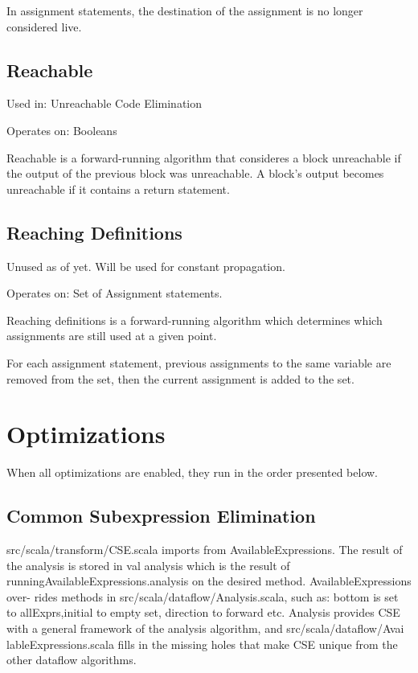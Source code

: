 \documentclass[11pt]{article}
\begin{document}
  In assignment statements, the destination of the assignment is no longer considered live.
\subsection{Reachable}
\label{sec-2-3}

  Used in: Unreachable Code Elimination

  Operates on: Booleans

  Reachable is a forward-running algorithm that consideres a block unreachable if the output of the previous
  block was unreachable. A block's output becomes unreachable if it contains a return statement.
\subsection{Reaching Definitions}
\label{sec-2-4}

  Unused as of yet. Will be used for constant propagation.

  Operates on: Set of Assignment statements.

  Reaching definitions is a forward-running algorithm which determines which assignments are still used
  at a given point.

  For each assignment statement, previous assignments to the same variable are removed from the set,
  then the current assignment is added to the set.
  
\section{Optimizations}
\label{sec-3}

  When all optimizations are enabled, they run in the order presented below.
\subsection{Common Subexpression Elimination}
\label{sec-3-1}

    src/scala/transform/CSE.scala imports from AvailableExpressions. The 
result of the analysis is stored in val analysis which is the result of runningAvailableExpressions.analysis on the desired method. AvailableExpressions over-
rides methods in src/scala/dataflow/Analysis.scala, such as: bottom is set to 
allExprs,initial to empty set, direction to forward etc. Analysis provides CSE 
with a general framework of the analysis algorithm, and src/scala/dataflow/Avai
lableExpressions.scala fills in the missing holes that make CSE unique from the
other dataflow algorithms. 
     
\end{document}
